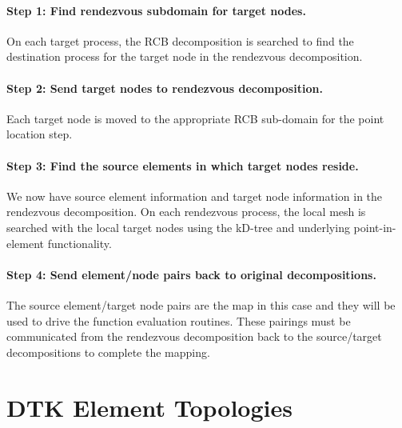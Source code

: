\documentclass[letterpaper,12pt]{article}
\begin{document}
\paragraph{Step 1: Find rendezvous subdomain for target nodes.}
On each target process, the RCB decomposition is searched to find the
destination process for the target node in the rendezvous
decomposition.

\paragraph{Step 2: Send target nodes to rendezvous decomposition.}
Each target node is moved to the appropriate RCB sub-domain for the
point location step.

\paragraph{Step 3: Find the source elements in which target nodes reside.}
We now have source element information and target node information in
the rendezvous decomposition. On each rendezvous process, the local
mesh is searched with the local target nodes using the kD-tree and
underlying point-in-element functionality.

\paragraph{Step 4: Send element/node pairs back to original
  decompositions.}  The source element/target node pairs are the map
in this case and they will be used to drive the function evaluation
routines. These pairings must be communicated from the rendezvous
decomposition back to the source/target decompositions to complete the
mapping.

\clearpage




\clearpage

\appendix
\section{DTK Element Topologies}\label{apdx:cell_topo}
\end{document}
